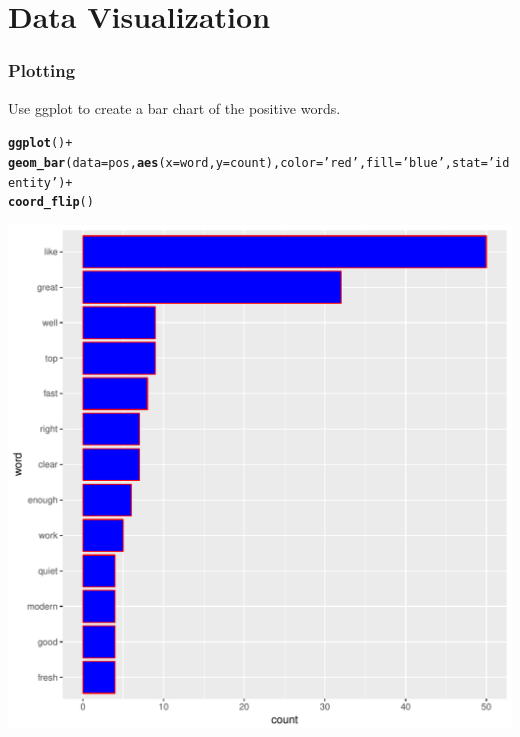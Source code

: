 \documentclass{beamer}\usepackage[]{graphicx}\usepackage[]{color}
\makeatletter
\def\maxwidth{ %
  \ifdim\Gin@nat@width>\linewidth
    \linewidth
  \else
    \Gin@nat@width
  \fi
}
\newcommand{\hlstr}[1]{\textcolor[rgb]{0.192,0.494,0.8}{#1}}%
\newcommand{\hlopt}[1]{\textcolor[rgb]{0,0,0}{#1}}%
\newcommand{\hlstd}[1]{\textcolor[rgb]{0.345,0.345,0.345}{#1}}%
\newcommand{\hlkwc}[1]{\textcolor[rgb]{0.333,0.667,0.333}{#1}}%
\newcommand{\hlkwd}[1]{\textcolor[rgb]{0.737,0.353,0.396}{\textbf{#1}}}%
\newenvironment{kframe}{%
 \def\at@end@of@kframe{}%
 \ifinner\ifhmode%
  \def\at@end@of@kframe{\end{minipage}}%
  \begin{minipage}{\columnwidth}%
 \fi\fi%
 \def\FrameCommand##1{\hskip\@totalleftmargin \hskip-\fboxsep
 \colorbox{shadecolor}{##1}\hskip-\fboxsep
     \hskip-\linewidth \hskip-\@totalleftmargin \hskip\columnwidth}%
 \MakeFramed {\advance\hsize-\width
   \@totalleftmargin\z@ \linewidth\hsize
   \@setminipage}}%
 {\par\unskip\endMakeFramed%
 \at@end@of@kframe}
\newenvironment{knitrout}{}{} %
\makeatother
\begin{document}
\section{Data Visualization}
\begin{frame}
\frametitle{Plotting}
Use ggplot to create a bar chart of the positive words. 
\begin{knitrout}
\color{fgcolor}\begin{kframe}
\begin{alltt}
\hlkwd{ggplot}\hlstd{()}\hlopt{+}
  \hlkwd{geom_bar}\hlstd{(}\hlkwc{data}\hlstd{=pos,}\hlkwd{aes}\hlstd{(}\hlkwc{x}\hlstd{=word,}\hlkwc{y}\hlstd{=count),}\hlkwc{color}\hlstd{=}\hlstr{'red'}\hlstd{,}\hlkwc{fill}\hlstd{=} \hlstr{'blue'}\hlstd{,}\hlkwc{stat}\hlstd{=}\hlstr{'identity'}\hlstd{)}\hlopt{+}
\hlkwd{coord_flip}\hlstd{()}
\end{alltt}
\end{kframe}
\includegraphics[width=\maxwidth]{figure/unnamed-chunk-13-1} 

\end{knitrout}
\framebreak
\end{frame}
\end{document}
